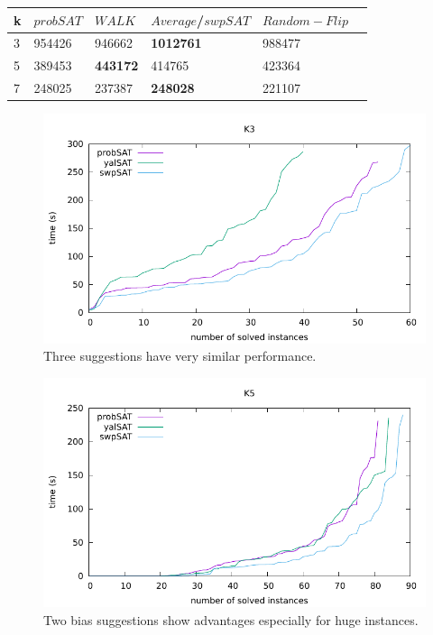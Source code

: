 \documentclass[12pt,a4paper,twoside]{scrartcl}
\numberwithin{equation}{section}
\begin{document}
   \begin{table}[H]
\begin{center}
    \begin{tabular}{|l|l|l|l|l|p{3cm}|}
\hline 

    k &$probSAT$&$WALK$&$Average$/$swpSAT$&$Random-Flip$ \\ \hline      
    3& 954426 &946662 &\textbf{1012761}&988477 \\ \hline
    5& 389453&\textbf{443172}&414765&423364\\ \hline
    7& 248025 &237387 &\textbf{248028}&221107 \\ \hline
	
\end{tabular}
\end{center}
\end{table}
  \begin{figure}[H]
\begin{center}
  \includegraphics[scale = 1]{DATA/K3/e5.pdf}
  \end{center}
  \caption{Three suggestions have very similar performance.}
  \label{Experiment 9 k3 cactus plot}
  \end{figure}
  \begin{figure}[H]
\begin{center}
  \includegraphics[scale = 1]{DATA/K5/e5.pdf}
  \end{center}
  \caption{Two bias suggestions show advantages especially for huge instances.}
  \label{Experiment 9 k5 cactus plot}
  \end{figure}
\end{document}
